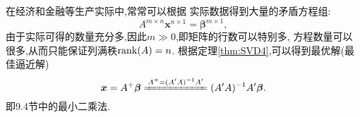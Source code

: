\begin{remark}
  在经济和金融等生产实际中,常常可以根据
  实际数据得到大量的矛盾方程组:
  \[
  A^{m\times n}\bm{x}^{n\times 1}=\bm{\beta}^{m\times 1},
\]
由于实际可得的数量充分多,因此$m\gg 0$,即矩阵的行数可以特别多,
方程数量可以很多,从而只能保证列满秩$\operatorname{rank}(A)=n$.
根据定理\ref{thm:SVD4},可以得到最优解(最佳逼近解)
  \[
    \bm{x}=A^+\bm{\beta} \xlongequal{A^+=(A'A)^{-1}A'}
    (A'A)^{-1}A'\bm{\beta}.
\]
即9.4节中的最小二乘法.
\end{remark}
